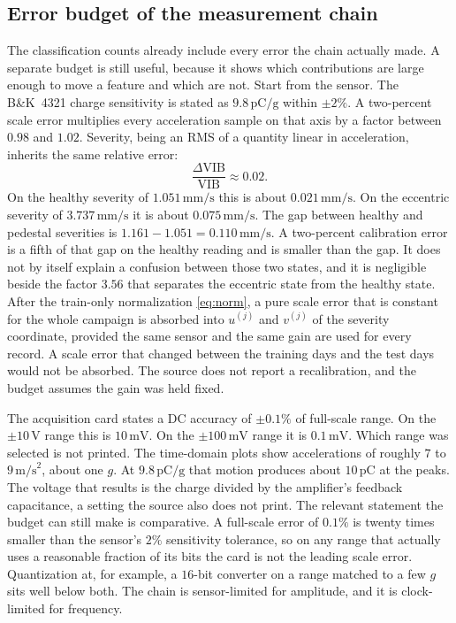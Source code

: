 \subsection{Error budget of the measurement chain}
\label{sec:budget}

The classification counts already include every error the chain actually made.
A separate budget is still useful, because it shows which contributions are large enough to move a feature and which are not.
Start from the sensor.
The B\&K~4321 charge sensitivity is stated as \(9.8\,\mathrm{pC/g}\) within \(\pm 2\%\).
A two-percent scale error multiplies every acceleration sample on that axis by a factor between \(0.98\) and \(1.02\).
Severity, being an RMS of a quantity linear in acceleration, inherits the same relative error:
\begin{equation}
\frac{\Delta\mathrm{VIB}}{\mathrm{VIB}}\approx 0.02.
\label{eq:senserr}
\end{equation}
On the healthy severity of \(1.051\,\mathrm{mm/s}\) this is about \(0.021\,\mathrm{mm/s}\).
On the eccentric severity of \(3.737\,\mathrm{mm/s}\) it is about \(0.075\,\mathrm{mm/s}\).
The gap between healthy and pedestal severities is \(1.161-1.051=0.110\,\mathrm{mm/s}\).
A two-percent calibration error is a fifth of that gap on the healthy reading and is smaller than the gap.
It does not by itself explain a confusion between those two states, and it is negligible beside the factor \(3.56\) that separates the eccentric state from the healthy state.
After the train-only normalization \eqref{eq:norm}, a pure scale error that is constant for the whole campaign is absorbed into \(u^{(j)}\) and \(v^{(j)}\) of the severity coordinate, provided the same sensor and the same gain are used for every record.
A scale error that changed between the training days and the test days would not be absorbed.
The source does not report a recalibration, and the budget assumes the gain was held fixed.

The acquisition card states a DC accuracy of \(\pm 0.1\%\) of full-scale range.
On the \(\pm 10\,\mathrm{V}\) range this is \(10\,\mathrm{mV}\).
On the \(\pm 100\,\mathrm{mV}\) range it is \(0.1\,\mathrm{mV}\).
Which range was selected is not printed.
The time-domain plots show accelerations of roughly \(7\) to \(9\,\mathrm{m/s}^{2}\), about one \(g\).
At \(9.8\,\mathrm{pC/g}\) that motion produces about \(10\,\mathrm{pC}\) at the peaks.
The voltage that results is the charge divided by the amplifier's feedback capacitance, a setting the source also does not print.
The relevant statement the budget can still make is comparative.
A full-scale error of \(0.1\%\) is twenty times smaller than the sensor's \(2\%\) sensitivity tolerance, so on any range that actually uses a reasonable fraction of its bits the card is not the leading scale error.
Quantization at, for example, a \(16\)-bit converter on a range matched to a few \(g\) sits well below both.
The chain is sensor-limited for amplitude, and it is clock-limited for frequency.

